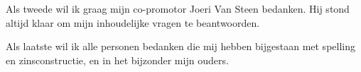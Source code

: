 \documentclass[pdftex,a4paper,12pt,twoside]{report}
\begin{document}
Als tweede wil ik graag mijn co-promotor Joeri Van Steen bedanken. Hij stond altijd klaar om mijn inhoudelijke vragen te beantwoorden. 

Als laatste wil ik alle personen bedanken die mij hebben bijgestaan met spelling en zinsconstructie, en in het bijzonder mijn ouders.




\tableofcontents


%
\end{document}
